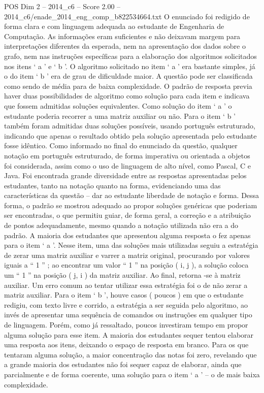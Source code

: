 \begin{textsample}{POS Dim 2 – 2014\_c6 – Score 2.00 – 2014\_c6/enade\_2014\_eng\_comp\_b822534664.txt}
O enunciado foi redigido de forma clara e com linguagem adequada ao estudante de Engenharia de Computação.
As informações eram suficientes e não deixavam margem para interpretações diferentes da esperada, nem na apresentação dos dados sobre o grafo, nem nas instruções específicas para a elaboração dos algoritmos solicitados nos itens ‘ a ’ e ‘ b ’.
O algoritmo solicitado no item ‘ a ’ era bastante simples, já o do item ‘ b ’ era de grau de dificuldade maior.
A questão pode ser classificada como sendo de média para de baixa complexidade.
O padrão de resposta previa haver duas possibilidades de algoritmo como solução para cada item e indicava que fossem admitidas soluções equivalentes.
Como solução do item ‘ a ’ o estudante poderia recorrer a uma matriz auxiliar ou não.
Para o item ‘ b ’ também foram admitidas duas soluções possíveis, usando português estruturado, indicando que apenas o resultado obtido pela solução apresentada pelo estudante fosse idêntico.
Como informado no final do enunciado da questão, qualquer notação em português estruturado, de forma imperativa ou orientada a objetos foi considerada, assim como o uso de linguagem de alto nível, como Pascal, C e Java.
Foi encontrada grande diversidade entre as respostas apresentadas pelos estudantes, tanto na notação quanto na forma, evidenciando uma das características da questão – dar ao estudante liberdade de notação e forma.
Dessa forma, o padrão se mostrou adequado ao propor soluções genéricas que poderiam ser encontradas, o que permitiu guiar, de forma geral, a correção e a atribuição de pontos adequadamente, mesmo quando a notação utilizada não era a do padrão.
A maioria dos estudantes que apresentou alguma resposta o fez apenas para o item ‘ a ’.
Nesse item, uma das soluções mais utilizadas seguiu a estratégia de zerar uma matriz auxiliar e varrer a matriz original, procurando por valores iguais a “ 1 ” ; ao encontrar um valor “ 1 ” na posição ( i, j ), a solução coloca um “ 1 ” na posição ( j, i ) da matriz auxiliar.
Ao final, retorna -se à matriz auxiliar.
Um erro comum ao tentar utilizar essa estratégia foi o de não zerar a matriz auxiliar.
Para o item ‘ b ’, houve casos ( poucos ) em que o estudante redigiu, com texto livre e corrido, a estratégia a ser seguida pelo algoritmo, ao invés de apresentar uma sequência de comandos ou instruções em qualquer tipo de linguagem.
Porém, como já ressaltado, poucos investiram tempo em propor alguma solução para esse item.
A maioria dos estudantes sequer tentou elaborar uma resposta aos itens, deixando o espaço de resposta em branco.
Para os que tentaram alguma solução, a maior concentração das notas foi zero, revelando que a grande maioria dos estudantes não foi sequer capaz de elaborar, ainda que parcialmente e de forma coerente, uma solução para o item ‘ a ’ – o de mais baixa complexidade.

\end{textsample}

